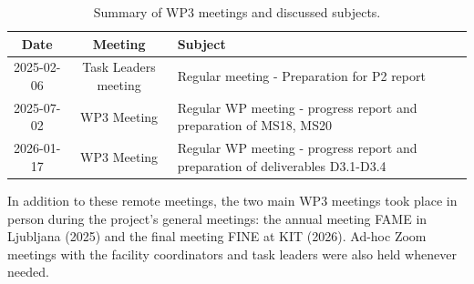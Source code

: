 \begin{table}[H]
    \centering
    \caption{Summary of WP3 meetings and discussed subjects.}
    {\color{black}\begin{tabularx}{\textwidth}{|c|c|X|} \hline
        \rowcolor{mycyan}
        \textbf{Date} & \textbf{Meeting} & \textbf{Subject} \\ \hline
        2025-02-06 & Task Leaders meeting & Regular meeting - Preparation for P2 report \\ \hline
        2025-07-02 & WP3 Meeting & Regular WP meeting - progress report and preparation of MS18, MS20 \\ \hline
        2026-01-17 & WP3 Meeting & Regular WP meeting - progress report and preparation of deliverables D3.1-D3.4 \\ \hline
    \end{tabularx}}
    \label{tab:wp3-meetings}
\end{table}
In addition to these remote meetings, the two main WP3 meetings took place in person during the project's general meetings: the annual meeting FAME in Ljubljana (2025) and the final meeting FINE at KIT (2026). Ad-hoc Zoom meetings with the facility coordinators and task leaders were also held whenever needed.


